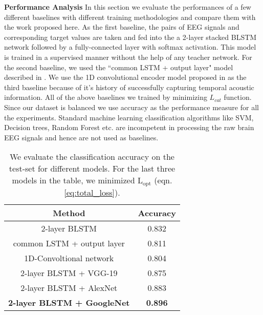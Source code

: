 \documentclass{article}
\begin{document}
\textbf{Performance Analysis}
In this section we evaluate the performances of a few different baselines with different training methodologies and compare them with the work proposed here. As the first baseline, the pairs of EEG signals and corresponding target values are taken and fed into the a 2-layer stacked BLSTM network followed by a fully-connected layer with softmax activation. This model is trained in a supervised manner without the help of any teacher network. For the second baseline, we used the ``common LSTM + output layer" model described in \cite{spampinato2017deep}.
We use the 1D convolutional encoder model proposed in \cite{aytar2016soundnet} as the third baseline because of it's history of successfully capturing temporal acoustic information. All of the above baselines we trained by minimizing $L_{cat}$ function. Since our dataset is balanced we use accuracy as the performance measure for all the experiments. Standard machine learning classification algorithms like SVM, Decision trees, Random Forest etc. are incompetent in processing the raw brain EEG signals and hence are not used as baselines. 

\begin{table}
\parbox{\linewidth}{
\centering
\begin{tabular}{cc}
\hline
\textbf{Method} & \textbf{Accuracy}\\
\hline
2-layer BLSTM & 0.832\\
common LSTM + output layer \cite{spampinato2017deep} & 0.811\\
1D-Convoltional network \cite{aytar2016soundnet} & 0.804\\
2-layer BLSTM + VGG-19 & 0.875\\
2-layer BLSTM + AlexNet & 0.883\\
\textbf{2-layer BLSTM + GoogleNet}  & \textbf{0.896}\\
\hline
\end{tabular}
\caption{We evaluate the classification accuracy on the test-set for different models. For the last three models in the table, we minimized $\mathrm{L_{opt}}$ (eqn. \ref{eq:total_loss}).}
\label{tab: exp1}
}
\end{table}
 
\end{document}
